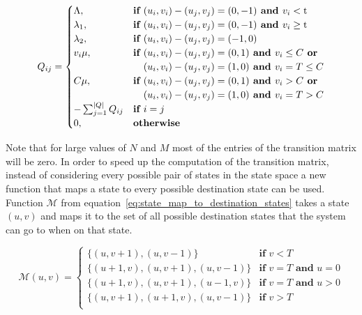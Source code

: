 \begin{equation} \label{eq:markov_transition_rate}
    Q_{ij} =
    \begin{cases}
        \Lambda, & \textbf{if } (u_i, v_i) - (u_j, v_j) = (0,-1) \textbf{ and }
        v_i < \text{t} \\
        \lambda_1, & \textbf{if } (u_i, v_i) - (u_j, v_j) = (0,-1)
        \textbf{ and } v_i \geq \text{t} \\
        \lambda_2, & \textbf{if } (u_i, v_i) - (u_j, v_j) = (-1,0) \\
        v_i \mu, & \textbf{if } (u_i, v_i) - (u_j, v_j) = (0,1) \textbf{ and }
        v_i \leq C \textbf{ or} \\ & \hspace{0.37cm}(u_i, v_i) - (u_j, v_j) =
        (1,0) \textbf{ and } v_i = T \leq C \\
        C \mu, & \textbf{if } (u_i, v_i) - (u_j, v_j) = (0,1) \textbf{ and }
        v_i > C
        \textbf{ or} \\ & \hspace{0.37cm}(u_i, v_i) - (u_j, v_j) = (1,0)
        \textbf{ and } v_i = T > C\\
        -\sum_{j=1}^{|Q|}{Q_{ij}} & \textbf{if } i = j \\
        0, & \textbf{otherwise}
    \end{cases}
\end{equation}

Note that for large values of \(N\) and \(M\) most of the entries of the
transition matrix will be zero.
In order to speed up the computation of the transition matrix, instead of
considering every possible pair of states in the state space a new function
that maps a state to every possible destination state can be used.
Function \(\mathcal{M}\) from
equation~\eqref{eq:state_map_to_destination_states}
takes a state \((u, v)\) and maps it to the set of
all possible destination states that the system can go to when on that state.

\begin{equation}\label{eq:state_map_to_destination_states}
    \mathcal{M}(u, v) =
    \begin{cases}
        \{(u, v + 1), (u, v - 1)\} & \textbf{if } v < T \\
        \{(u + 1, v), (u, v + 1), (u, v - 1)\} & \textbf{if } v = T
        \textbf{ and } u = 0 \\
        \{(u + 1, v), (u, v + 1), (u - 1, v)\} & \textbf{if } v = T
        \textbf{ and } u > 0 \\
        \{(u, v + 1), (u + 1, v), (u, v - 1)\} & \textbf{if } v > T \\
    \end{cases}
\end{equation}


